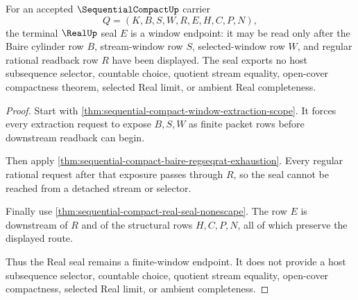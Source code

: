 \begin{theorem}
\label{thm:sequential-compact-real-seal-window-nonescape}
For an accepted $\SequentialCompactUp$ carrier
$$
Q=(K,B,S,W,R,E,H,C,P,N),
$$
the terminal $\RealUp$ seal $E$ is a window endpoint: it may be read only after the Baire cylinder row $B$, stream-window row $S$, selected-window row $W$, and regular rational readback row $R$ have been displayed. The seal exports no host subsequence selector, countable choice, quotient stream equality, open-cover compactness theorem, selected Real limit, or ambient Real completeness.
\end{theorem}
\begin{proof}
Start with \autoref{thm:sequential-compact-window-extraction-scope}. It forces every extraction request to expose $B,S,W$ as finite packet rows before downstream readback can begin.

Then apply \autoref{thm:sequential-compact-baire-regseqrat-exhaustion}. Every regular rational request after that exposure passes through $R$, so the seal cannot be reached from a detached stream or selector.

Finally use \autoref{thm:sequential-compact-real-seal-nonescape}. The row $E$ is downstream of $R$ and of the structural rows $H,C,P,N$, all of which preserve the displayed route.

Thus the Real seal remains a finite-window endpoint. It does not provide a host subsequence selector, countable choice, quotient stream equality, open-cover compactness, selected Real limit, or ambient completeness.
\end{proof}

